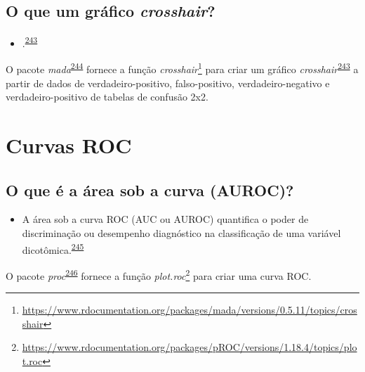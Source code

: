 \documentclass[
  a4paper,
]{book}
\providecommand{\tightlist}{%
  \setlength{\itemsep}{0pt}\setlength{\parskip}{0pt}}
\renewcommand{\href}[2]{#2\footnote{\url{#1}}}
\newenvironment{infobox}[1]
  {
  \begin{itemize}
  \renewcommand{\labelitemi}{
    \raisebox{-.7\height}[0pt][0pt]{
      {\setkeys{Gin}{width=3em,keepaspectratio}
        \texttt{[image: \#1]}}
    }
  }
  \setlength{\fboxsep}{1em}
  \begin{blackbox}
  \item
  }
  {
  \end{blackbox}
  \end{itemize}
  }
\begin{document}
\hypertarget{o-que-um-gruxe1fico-crosshair}{%
\subsection{\texorpdfstring{O que um gráfico \emph{crosshair}?}{O que um gráfico crosshair?}}\label{o-que-um-gruxe1fico-crosshair}}

\begin{itemize}
\tightlist
\item
  .\textsuperscript{\protect\hyperlink{ref-phillips2010}{243}}
\end{itemize}

\begin{infobox}{images/Rlogo}
O pacote \emph{mada}\textsuperscript{\protect\hyperlink{ref-mada}{244}} fornece a função \href{https://www.rdocumentation.org/packages/mada/versions/0.5.11/topics/crosshair}{\emph{crosshair}} para criar um gráfico \emph{crosshair}\textsuperscript{\protect\hyperlink{ref-phillips2010}{243}} a partir de dados de verdadeiro-positivo, falso-positivo, verdadeiro-negativo e verdadeiro-positivo de tabelas de confusão 2x2.

\end{infobox}

\hypertarget{curvas-roc}{%
\section{Curvas ROC}\label{curvas-roc}}

\hypertarget{o-que-uxe9-a-uxe1rea-sob-a-curva-auroc}{%
\subsection{O que é a área sob a curva (AUROC)?}\label{o-que-uxe9-a-uxe1rea-sob-a-curva-auroc}}

\begin{itemize}
\tightlist
\item
  A área sob a curva ROC (AUC ou AUROC) quantifica o poder de discriminação ou desempenho diagnóstico na classificação de uma variável dicotômica.\textsuperscript{\protect\hyperlink{ref-de2022}{245}}
\end{itemize}

\begin{infobox}{images/Rlogo}
O pacote \emph{proc}\textsuperscript{\protect\hyperlink{ref-pROC}{246}} fornece a função \href{https://www.rdocumentation.org/packages/pROC/versions/1.18.4/topics/plot.roc}{\emph{plot.roc}} para criar uma curva ROC.

\end{infobox}
\end{document}
